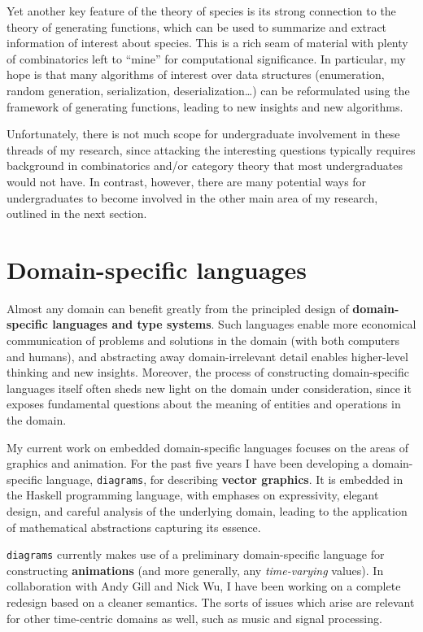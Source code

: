 \documentclass[12pt]{article}
\begin{document}
Yet another key feature of the theory of species is its strong
connection to the theory of generating functions, which can be used to
summarize and extract information of interest about species.  This is
a rich seam of material with plenty of combinatorics left to ``mine''
for computational significance.  In particular, my hope is that many
algorithms of interest over data structures (enumeration, random
generation, serialization, deserialization\dots) can be reformulated
using the framework of generating functions, leading to new insights
and new algorithms.

Unfortunately, there is not much scope for undergraduate involvement
in these threads of my research, since attacking the interesting
questions typically requires background in combinatorics and/or
category theory that most undergraduates would not have.  In contrast,
however, there are many potential ways for undergraduates to become
involved in the other main area of my research, outlined in the next
section.

\section*{Domain-specific languages}
\label{sec:edsls}

Almost any domain can benefit greatly from the principled design of
\textbf{domain-specific languages and type systems}.  Such languages
enable more economical communication of problems and solutions in the
domain (with both computers and humans), and abstracting away
domain-irrelevant detail enables higher-level thinking and new
insights.  Moreover, the process of constructing domain-specific
languages itself often sheds new light on the domain under
consideration, since it exposes fundamental questions about the
meaning of entities and operations in the domain.

My current work on embedded domain-specific languages focuses on the
areas of graphics and animation.  For the past five years I have been
developing a domain-specific language, \texttt{diagrams}, for
describing \textbf{vector graphics}.  It is embedded in the Haskell
programming language, with emphases on expressivity, elegant design,
and careful analysis of the underlying domain, leading to the
application of mathematical abstractions capturing its essence.

\texttt{diagrams} currently makes use of a preliminary domain-specific
language for constructing \textbf{animations} (and more generally, any
\emph{time-varying} values).  In collaboration with Andy Gill and Nick
Wu, I have been working on a complete redesign based on a cleaner
semantics.  The sorts of issues which arise are relevant for other
time-centric domains as well, such as music and signal processing.
\end{document}
